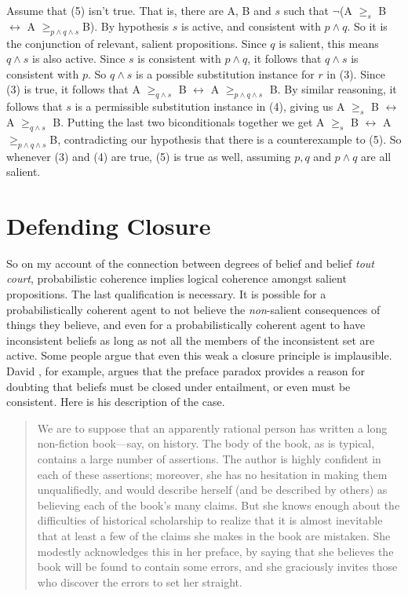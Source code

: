 \noindent Assume that (5) isn't true. That is, there are A, B and \(s\) such that \(\neg\)(A \(\geq_s\) B \(\leftrightarrow\) A \(\geq _{p \wedge q \wedge s}\)B). By hypothesis \(s\) is active, and consistent with \(p \wedge q\). So it is the conjunction of relevant, salient propositions. Since \(q\) is salient, this means \(q \wedge s\) is also active. Since \(s\) is consistent with \(p \wedge q\), it follows that \(q \wedge s\) is consistent with \(p\). So \(q \wedge s\) is a possible substitution instance for \(r\) in (3). Since (3) is true, it follows that A \(\geq _{q \wedge s}\) B \(\leftrightarrow\) A \(\geq _{p \wedge q \wedge s}\) B. By similar reasoning, it follows that \(s\) is a permissible substitution instance in (4), giving us A \(\geq_s\) B \(\leftrightarrow\) A \(\geq _{q \wedge s}\) B. Putting the last two biconditionals together we get A \(\geq_s\) B \(\leftrightarrow\) A \(\geq _{p \wedge q \wedge s}\)B, contradicting our hypothesis that there is a counterexample to (5). So whenever (3) and (4) are true, (5) is true as well, assuming \(p, q\) and \(p \wedge q\) are all salient.


\section{Defending Closure}

So on my account of the connection between degrees of belief and belief \textit{tout court}, probabilistic coherence implies logical coherence amongst salient propositions. The last qualification is necessary. It is possible for a probabilistically coherent agent to not believe the \textit{non}{}-salient consequences of things they believe, and even for a probabilistically coherent agent to have inconsistent beliefs as long as not all the members of the inconsistent set are active. Some people argue that even this weak a closure principle is implausible. David \cite{Christensen2005}, for example, argues that the preface paradox provides a reason for doubting that beliefs must be closed under entailment, or even must be consistent. Here is his description of the case.

\begin{quote}
We are to suppose that an apparently rational person has written a long non-fiction book---say, on history. The body of the book, as is typical, contains a large number of assertions. The author is highly confident in each of these assertions; moreover, she has no hesitation in making them unqualifiedly, and would describe herself (and be described by others) as believing each of the book's many claims. But she knows enough about the difficulties of historical scholarship to realize that it is almost inevitable that at least a few of the claims she makes in the book are mistaken. She modestly acknowledges this in her preface, by saying that she believes the book will be found to contain some errors, and she graciously invites those who discover the errors to set her straight. \citep[33-4]{Christensen2005}
\end{quote}

